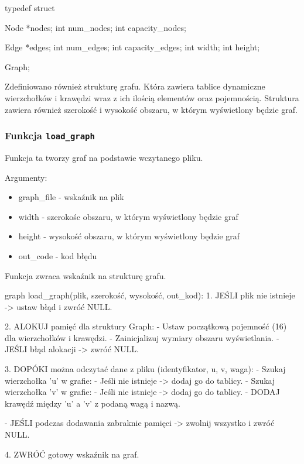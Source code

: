 \documentclass[]{article}
\begin{document}
\begin{mylisting}
typedef struct{
    Node *nodes;
    int num_nodes;
    int capacity_nodes;
    
    Edge *edges;
    int num_edges;
    int capacity_edges;
    int width;
    int height;
} Graph;
\end{mylisting}
Zdefiniowano również strukturę grafu. Która zawiera tablice dynamiczne wierzchołków i krawędzi wraz z ich ilością 
elementów oraz pojemnością. Struktura zawiera również szerokość i wysokość obszaru, w którym wyświetlony będzie graf.

 \subsubsection{Funkcja \texttt{load\_graph}}

Funkcja ta tworzy graf na podstawie wczytanego pliku.


Argumenty:

\begin{itemize}

\item graph\_file - wskaźnik na plik

\item width - szerokośc obszaru, w którym wyświetlony będzie graf

\item height - wysokość obszaru, w którym wyświetlony będzie graf

\item out\_code - kod błędu

\end{itemize}

Funkcja zwraca wskaźnik na strukturę grafu.

\begin{mylisting}

graph load_graph(plik, szerokość, wysokość, out_kod):
    1. JEŚLI plik nie istnieje -> ustaw błąd i zwróć NULL.

    2. ALOKUJ pamięć dla struktury Graph:
       - Ustaw początkową pojemność (16) dla wierzchołków i krawędzi.
       - Zainicjalizuj wymiary obszaru wyświetlania.
       - JEŚLI błąd alokacji -> zwróć NULL.

    3. DOPÓKI można odczytać dane z pliku (identyfikator, u, v, waga):
       - Szukaj wierzchołka 'u' w grafie:
         - Jeśli nie istnieje -> dodaj go do tablicy.
       - Szukaj wierzchołka 'v' w grafie:
         - Jeśli nie istnieje -> dodaj go do tablicy.
       - DODAJ krawędź między 'u' a 'v' z podaną wagą i nazwą.
       
       - JEŚLI podczas dodawania zabraknie pamięci -> zwolnij wszystko i zwróć NULL.

    4. ZWRÓĆ gotowy wskaźnik na graf.
\end{mylisting}
\end{document}
